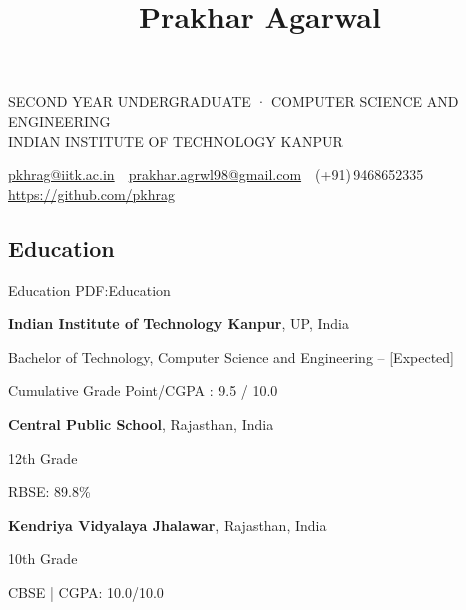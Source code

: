 \documentclass[letterpaper,10pt,oneside]{article}
\newcommand{\CVAuthor}{Prakhar Agarwal}
\newcommand{\CVWebpage}{https://github.com/pkhrag}
\begin{document}

\title{\CVAuthor}

\begin{subtitle}
{SECOND YEAR UNDERGRADUATE · COMPUTER SCIENCE AND ENGINEERING}
\\{INDIAN INSTITUTE OF TECHNOLOGY KANPUR}
\par
\href{mailto:pkhrag@iitk.ac.in}
{pkhrag@iitk.ac.in}
\,\SubBulletSymbol\,
\href{mailto:prakhar.agrwl98@gmail.com}
{prakhar.agrwl98@gmail.com}
\,\SubBulletSymbol\,
(+91)\,9468652335
\,\SubBulletSymbol\,
\href{\CVWebpage}
{\CVWebpage}
\end{subtitle}

\begin{body}


\section
{Education}
{Education}
{PDF:Education}

{\textbf{Indian Institute of Technology Kanpur}},
UP, India

\GapNoBreak
\BulletItem
Bachelor of Technology, Computer Science and Engineering
\hfill
{} --
 [Expected]
\begin{detail}
\SubBulletItem
Cumulative Grade Point/CGPA : 9.5 / 10.0
\end{detail}

\BigGap
{\textbf{Central Public School}},
Rajasthan, India

\GapNoBreak
\BulletItem
12th Grade
\hfill
{}
\begin{detail}
\SubBulletItem
RBSE: 89.8\%
\end{detail}

\BigGap
{\textbf{Kendriya Vidyalaya Jhalawar}},
Rajasthan, India

\GapNoBreak
\BulletItem
10th Grade
\hfill
{}
\begin{detail}
\SubBulletItem
CBSE | CGPA: 10.0/10.0
\end{detail}




\end{body}
\end{document}
